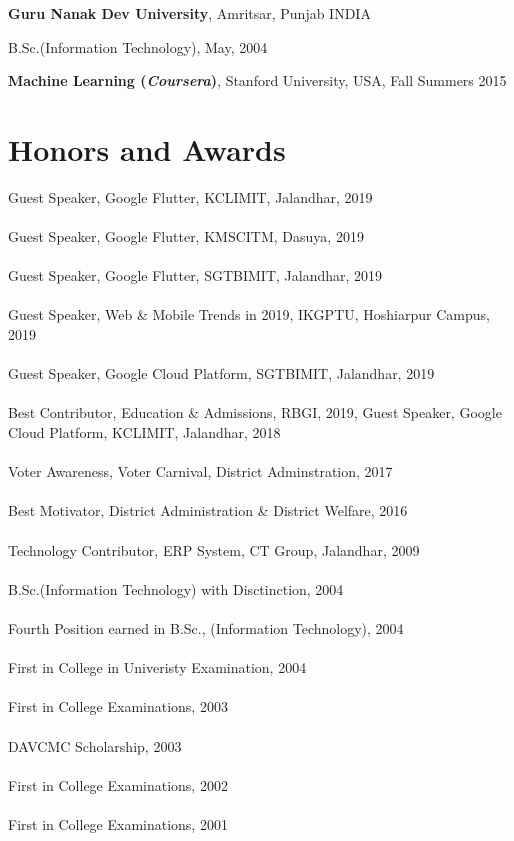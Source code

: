 \documentclass[margin,line]{res}
\newenvironment{list1}{
  \begin{list}{\ding{113}}{%
      \setlength{\itemsep}{0in}
      \setlength{\parsep}{0in} \setlength{\parskip}{0in}
      \setlength{\topsep}{0in} \setlength{\partopsep}{0in}
      \setlength{\leftmargin}{0.17in}}}{\end{list}}
\begin{document}
\begin{resume}
{\bf Guru Nanak Dev University}, Amritsar, Punjab INDIA\\
\vspace*{-.1in}
\begin{list1}
\item[] B.Sc.(Information Technology),  May, 2004
\end{list1}

{\bf Machine Learning (\textit{Coursera})}, Stanford University, USA, Fall Summers 2015\\
\vspace*{-.1in}

\section{\sc Honors and Awards}
Guest Speaker, Google Flutter, KCLIMIT, Jalandhar, 2019\\\\
Guest Speaker, Google Flutter, KMSCITM, Dasuya, 2019\\\\
Guest Speaker, Google Flutter, SGTBIMIT, Jalandhar, 2019\\\\
Guest Speaker, Web \& Mobile Trends in 2019, IKGPTU, Hoshiarpur Campus, 2019\\\\
Guest Speaker, Google Cloud Platform, SGTBIMIT, Jalandhar, 2019\\\\
Best Contributor, Education \& Admissions, RBGI, 2019,
Guest Speaker, Google Cloud Platform, KCLIMIT, Jalandhar, 2018\\\\
Voter Awareness, Voter Carnival, District Adminstration, 2017\\\\
Best Motivator, District Administration \& District Welfare, 2016\\\\
Technology Contributor, ERP System, CT Group, Jalandhar, 2009\\\\
B.Sc.(Information Technology) with Disctinction, 2004\\\\
Fourth Position earned in B.Sc., (Information Technology), 2004\\\\
First in College in Univeristy Examination, 2004\\\\
First in College Examinations, 2003\\\\
DAVCMC Scholarship, 2003\\\\
First in College Examinations, 2002\\\\
First in College Examinations, 2001\\


\end{resume}
\end{document}
